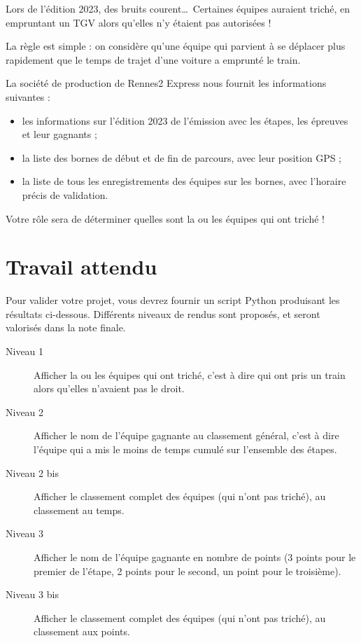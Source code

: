 \documentclass[11pt,a4paper]{article}
\begin{document}
\vspace{2em}
Lors de l'édition 2023, des bruits courent\dots ~Certaines équipes auraient triché, en empruntant un TGV alors qu'elles n'y étaient pas autorisées !

La règle est simple : on considère qu'une équipe qui parvient à se déplacer plus rapidement que le temps de trajet d'une voiture a emprunté le train.

La société de production de Rennes2 Express nous fournit les informations suivantes : 
\begin{itemize}
    \item les informations sur l'édition 2023 de l'émission avec les étapes, les épreuves et leur gagnants ;
    \item la liste des bornes de début et de fin de parcours, avec leur position GPS ;
    \item la liste de tous les enregistrements des équipes sur les bornes, avec l'horaire précis de validation.
\end{itemize}


Votre rôle sera de déterminer quelles sont la ou les équipes qui ont triché !

\section{Travail attendu}

Pour valider votre projet, vous devrez fournir un script Python produisant les résultats ci-dessous.
 Différents niveaux de rendus sont proposés, et seront valorisés dans la note finale. 

\begin{description}
    \item[Niveau 1] Afficher la ou les équipes qui ont triché, c'est à dire qui ont pris un train alors qu'elles n'avaient pas le droit. 
    \item[Niveau 2] Afficher le nom de l'équipe gagnante au classement général, c'est à dire l'équipe qui a mis le moins de temps cumulé sur l'ensemble des étapes. 
    \item[Niveau 2 bis] Afficher le classement complet des équipes (qui n'ont pas triché), au classement au temps.
    \item[Niveau 3] Afficher le nom de l'équipe gagnante en nombre de points (3 points pour le premier de l'étape, 2 points pour le second, un point pour le troisième).
    \item[Niveau 3 bis] Afficher le classement complet des équipes (qui n'ont pas triché), au classement aux points.

\end{description}
\end{document}
